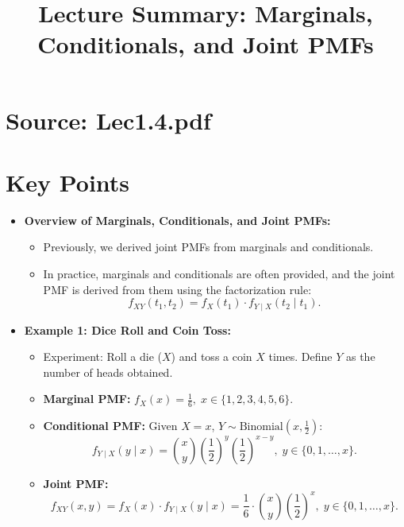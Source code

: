 \documentclass{article}
\title{Lecture Summary: Marginals, Conditionals, and Joint PMFs}
\author{}
\date{}
\begin{document}
\maketitle

\section*{Source: Lec1.4.pdf}

\section*{Key Points}

\begin{itemize}
  \item \textbf{Overview of Marginals, Conditionals, and Joint PMFs:}
    \begin{itemize}
      \item Previously, we derived joint PMFs from marginals and conditionals.
      \item In practice, marginals and conditionals are often provided, and the joint PMF is derived from them using the factorization rule:
        \[
          f_{XY}(t_1, t_2) = f_X(t_1) \cdot f_{Y \mid X}(t_2 \mid t_1).
        \]
    \end{itemize}

  \item \textbf{Example 1: Dice Roll and Coin Toss:}
    \begin{itemize}
      \item Experiment: Roll a die ($X$) and toss a coin $X$ times. Define $Y$ as the number of heads obtained.
      \item \textbf{Marginal PMF:} $f_X(x) = \frac{1}{6}, \; x \in \{1, 2, 3, 4, 5, 6\}$.
      \item \textbf{Conditional PMF:} Given $X = x$, $Y \sim \text{Binomial}(x, \frac{1}{2})$:
        \[
          f_{Y \mid X}(y \mid x) = \binom{x}{y} \left(\frac{1}{2}\right)^y \left(\frac{1}{2}\right)^{x-y}, \; y \in \{0, 1, \dots, x\}.
        \]
      \item \textbf{Joint PMF:}
        \[
          f_{XY}(x, y) = f_X(x) \cdot f_{Y \mid X}(y \mid x) = \frac{1}{6} \cdot \binom{x}{y} \left(\frac{1}{2}\right)^x, \; y \in \{0, 1, \dots, x\}.
        \]
    \end{itemize}


\end{itemize}
\end{document}
